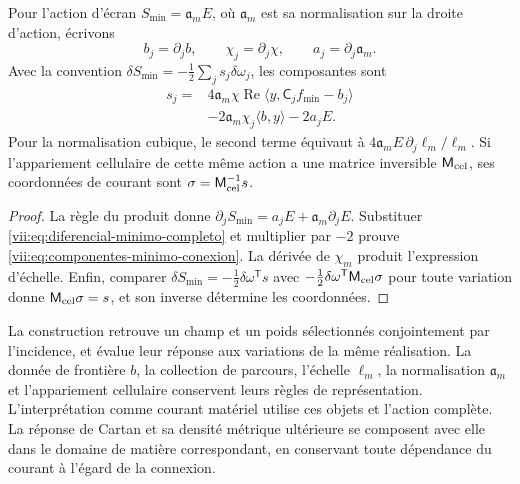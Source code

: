 \begin{theorem}
\label{vii:thm:componentes-minimo-conexion}
Pour l'action d'écran
\(S_{\min}=\mathfrak a_m E\), où \(\mathfrak a_m\) est sa
normalisation sur la droite d'action, écrivons
\[
 b_j=\partial_jb,\qquad \chi_j=\partial_j\chi,
 \qquad a_j=\partial_j\mathfrak a_m.
\]
Avec la convention \(\delta S_{\min}=-\tfrac12\sum_j s_j\delta\omega_j\),
les composantes sont
\begin{equation}
 \begin{split}
 s_j={}&4\mathfrak a_m\chi\operatorname{Re}
             \langle y,\mathsf C_jf_{\min}-b_j\rangle\\
      &-2\mathfrak a_m\chi_j\langle b,y\rangle-2a_jE.
 \end{split}
 \label{vii:eq:componentes-minimo-conexion}
\end{equation}
Pour la normalisation cubique, le second terme équivaut à
\(4\mathfrak a_m E\,\partial_j\ell_m/\ell_m\).
Si l'appariement cellulaire de cette même action a une matrice
inversible \(\mathsf M_{\rm cel}\), ses coordonnées de courant
sont \(\sigma=\mathsf M_{\rm cel}^{-1}s\).
\end{theorem}

\begin{proof}
La règle du produit donne
\(\partial_jS_{\min}=a_jE+\mathfrak a_m\partial_jE\).
Substituer \eqref{vii:eq:diferencial-minimo-completo} et multiplier
par \(-2\) prouve \eqref{vii:eq:componentes-minimo-conexion}.
La dérivée de \(\chi_m\) produit l'expression d'échelle.
Enfin, comparer
\(\delta S_{\min}=-\tfrac12\delta\omega^{\mathsf T}s\)
avec \(-\tfrac12\delta\omega^{\mathsf T}\mathsf M_{\rm cel}\sigma\)
pour toute variation donne \(\mathsf M_{\rm cel}\sigma=s\),
et son inverse détermine les coordonnées.
\end{proof}

La construction retrouve un champ et un poids sélectionnés conjointement par l'incidence, et évalue leur réponse aux variations de la même réalisation. La donnée de frontière \(b\), la collection de parcours, l'échelle \(\ell_m\), la normalisation \(\mathfrak a_m\) et l'appariement cellulaire conservent leurs règles de représentation. L'interprétation comme courant matériel utilise ces objets et l'action complète. La réponse de Cartan et sa densité métrique ultérieure se composent avec elle dans le domaine de matière correspondant, en conservant toute dépendance du courant à l'égard de la connexion.
